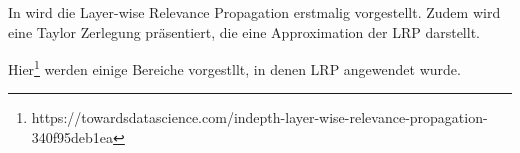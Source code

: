 \documentclass[11pt,a4paper]{article}
\numberwithin{equation}{section}
\begin{document}
	
	In \cite{LRP_first_paper} wird die Layer-wise Relevance Propagation erstmalig vorgestellt. Zudem wird eine Taylor Zerlegung präsentiert, die eine Approximation der LRP darstellt. 
	
	Hier\footnote{https://towardsdatascience.com/indepth-layer-wise-relevance-propagation-340f95deb1ea} werden einige Bereiche vorgestllt, in denen LRP angewendet wurde.

\end{document}
